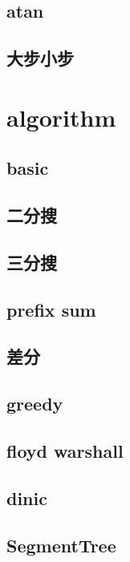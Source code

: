         \subsection{atan}
            
        \subsection{大步小步}
            
        

\section{algorithm}
    \subsection{basic}
        
    \subsection{二分搜}
        
    \subsection{三分搜}
        
    \subsection{prefix sum}
        
    \subsection{差分}
        
    \subsection{greedy}
        
    \subsection{floyd warshall}
        
    \subsection{dinic}
        
    \subsection{SegmentTree}
        
